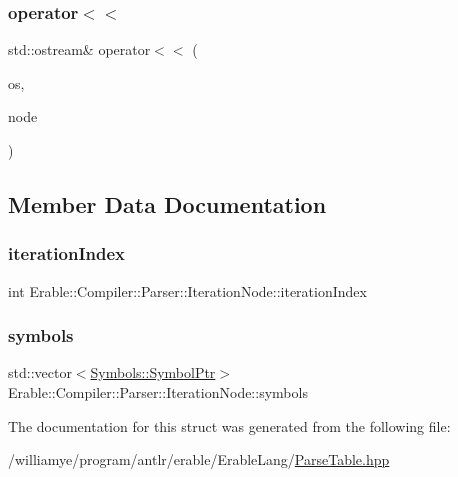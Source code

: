 \subsubsection{\texorpdfstring{operator$<$$<$}{operator<<}}
{\footnotesize\ttfamily std\+::ostream\& operator$<$$<$ (\begin{DoxyParamCaption}\item[{std\+::ostream \&}]{os,  }\item[{const \mbox{\hyperlink{struct_erable_1_1_compiler_1_1_parser_1_1_iteration_node}{Iteration\+Node}} \&}]{node }\end{DoxyParamCaption})\hspace{0.3cm}{\ttfamily [friend]}}



\subsection{Member Data Documentation}
\mbox{\label{struct_erable_1_1_compiler_1_1_parser_1_1_iteration_node_affbead65ce3682173daa904413ce1b30}} 
\subsubsection{\texorpdfstring{iterationIndex}{iterationIndex}}
{\footnotesize\ttfamily int Erable\+::\+Compiler\+::\+Parser\+::\+Iteration\+Node\+::iteration\+Index}

\mbox{\label{struct_erable_1_1_compiler_1_1_parser_1_1_iteration_node_ad0672016683f85369fe2f2776d8808c5}} 
\subsubsection{\texorpdfstring{symbols}{symbols}}
{\footnotesize\ttfamily std\+::vector$<$\mbox{\hyperlink{namespace_erable_1_1_compiler_1_1_symbols_a8f0bc762f448ea4d84e8713ab3e140b9}{Symbols\+::\+Symbol\+Ptr}}$>$ Erable\+::\+Compiler\+::\+Parser\+::\+Iteration\+Node\+::symbols}



The documentation for this struct was generated from the following file\+:\begin{DoxyCompactItemize}
\item 
/williamye/program/antlr/erable/\+Erable\+Lang/\mbox{\hyperlink{_parse_table_8hpp}{Parse\+Table.\+hpp}}\end{DoxyCompactItemize}
